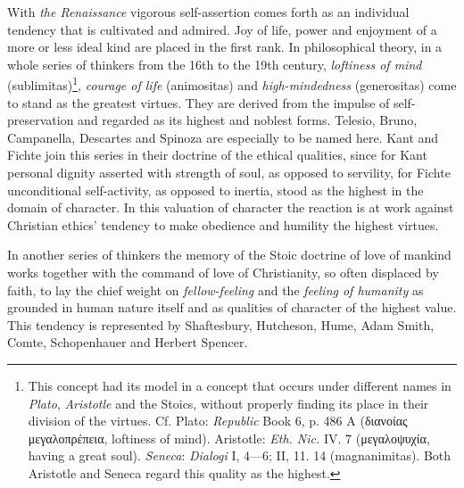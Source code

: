 \documentclass[12pt,a4paper,openany]{book}
\newcommand{\opage}[1]{\marginnote{\footnotesize\textit{[#1]}}}
\begin{document}
With \textit{the Renaissance} vigorous self-assertion comes forth as an individual tendency that is cultivated and
admired. Joy of life, power and enjoyment of a more or less ideal kind are placed in the first rank. In
philosophical theory, in a whole series of thinkers from the 16th to the 19th century, \textit{loftiness of
mind} (sublimitas)\footnote[3]{This concept had its model in a concept that occurs under different names in
\emph{Plato}, \emph{Aristotle} and the Stoics, without properly finding its place in their division of the
virtues. Cf. Plato: \textit{Republic} Book 6, p. 486 A (διανοίας μεγαλοπρέπεια, loftiness of mind). Aristotle:
\textit{Eth. Nic.} IV. 7 (μεγαλοψυχία, having a great soul). \emph{Seneca}: \textit{Dialogi} I, 4---6; II, 11.
14 (magnanimitas). Both Aristotle and Seneca regard this quality as the highest.}, \textit{courage of life}
(animositas) and \textit{high-mindedness} (generositas) come to stand as the greatest virtues. They are derived
from the impulse of self-preservation and regarded as its highest and noblest forms. Telesio, Bruno, Campanella,
Descartes and Spinoza are especially to be named here. Kant and Fichte join this series in their doctrine of the
ethical qualities, since for Kant personal dignity asserted with strength of soul, as opposed to servility, for
Fichte unconditional self-activity, as opposed to inertia, stood as the highest in the domain of character. In
this valuation of character the reaction is at work against Christian ethics'
\opage{205}tendency to make obedience and humility the highest virtues.

In another series of thinkers the memory of the Stoic doctrine of love of mankind works together with the
command of love of Christianity, so often displaced by faith, to lay the chief weight on \textit{fellow-feeling}
and the \textit{feeling of humanity} as grounded in human nature itself and as qualities of character of the
highest value. This tendency is represented by Shaftesbury, Hutcheson, Hume, Adam Smith, Comte, Schopenhauer and
Herbert Spencer.
\end{document}

